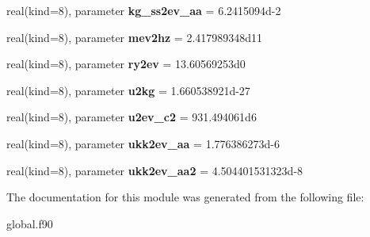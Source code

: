 \begin{DoxyCompactItemize}
\item 
\hypertarget{classunitconvert_aa428ebb0ffcc1a8c3c0455ba2e33ac76}{real(kind=8), parameter {\bfseries kg\-\_\-ss2ev\-\_\-aa} = 6.\-2415094d-\/2}\label{classunitconvert_aa428ebb0ffcc1a8c3c0455ba2e33ac76}

\item 
\hypertarget{classunitconvert_a64a1f40bba897a82dd4affc34f172269}{real(kind=8), parameter {\bfseries mev2hz} = 2.\-417989348d11}\label{classunitconvert_a64a1f40bba897a82dd4affc34f172269}

\item 
\hypertarget{classunitconvert_ad35935d3078efe530a99036654ee9c33}{real(kind=8), parameter {\bfseries ry2ev} = 13.\-60569253d0}\label{classunitconvert_ad35935d3078efe530a99036654ee9c33}

\item 
\hypertarget{classunitconvert_a52cbe5682f5a4772fff337727ab9d693}{real(kind=8), parameter {\bfseries u2kg} = 1.\-660538921d-\/27}\label{classunitconvert_a52cbe5682f5a4772fff337727ab9d693}

\item 
\hypertarget{classunitconvert_a10ac236aa6c9d218d946c931390e4577}{real(kind=8), parameter {\bfseries u2ev\-\_\-c2} = 931.\-494061d6}\label{classunitconvert_a10ac236aa6c9d218d946c931390e4577}

\item 
\hypertarget{classunitconvert_a8506dceb7dea8a4ca7c4ea2b038c6dbd}{real(kind=8), parameter {\bfseries ukk2ev\-\_\-aa} = 1.\-776386273d-\/6}\label{classunitconvert_a8506dceb7dea8a4ca7c4ea2b038c6dbd}

\item 
\hypertarget{classunitconvert_abf3bd87ca182bf85c07a042b91b74fd9}{real(kind=8), parameter {\bfseries ukk2ev\-\_\-aa2} = 4.\-504401531323d-\/8}\label{classunitconvert_abf3bd87ca182bf85c07a042b91b74fd9}

\end{DoxyCompactItemize}


The documentation for this module was generated from the following file\-:\begin{DoxyCompactItemize}
\item 
global.\-f90\end{DoxyCompactItemize}
